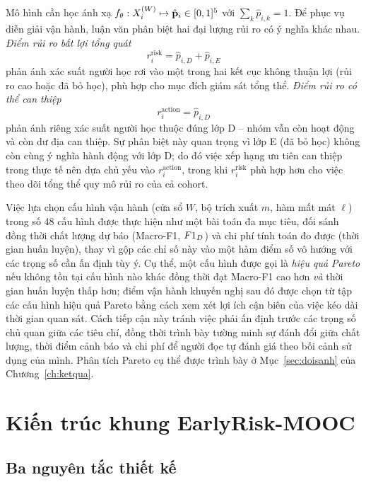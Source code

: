 Mô hình cần học ánh xạ $f_\theta : X_i^{(W)} \mapsto \hat{\mathbf{p}}_i \in [0,1]^5$ với $\sum_k \hat{p}_{i,k} = 1$. Để phục vụ diễn giải vận hành, luận văn phân biệt hai đại lượng rủi ro có ý nghĩa khác nhau. \emph{Điểm rủi ro bất lợi tổng quát}
\begin{equation}
r_i^{\text{risk}} = \hat{p}_{i,D} + \hat{p}_{i,E}
\end{equation}
phản ánh xác suất người học rơi vào một trong hai kết cục không thuận lợi (rủi ro cao hoặc đã bỏ học), phù hợp cho mục đích giám sát tổng thể. \emph{Điểm rủi ro có thể can thiệp}
\begin{equation}
r_i^{\text{action}} = \hat{p}_{i,D}
\end{equation}
phản ánh riêng xác suất người học thuộc đúng lớp D -- nhóm vẫn còn hoạt động và còn dư địa can thiệp. Sự phân biệt này quan trọng vì lớp E (đã bỏ học) không còn cùng ý nghĩa hành động với lớp D; do đó việc xếp hạng ưu tiên can thiệp trong thực tế nên dựa chủ yếu vào $r_i^{\text{action}}$, trong khi $r_i^{\text{risk}}$ phù hợp hơn cho việc theo dõi tổng thể quy mô rủi ro của cả cohort.

Việc lựa chọn cấu hình vận hành (cửa sổ $W$, bộ trích xuất $m$, hàm mất mát $\ell$) trong số 48 cấu hình được thực hiện như một bài toán đa mục tiêu, đối sánh đồng thời chất lượng dự báo (Macro-F1, $F1_{D}$) và chi phí tính toán đo được (thời gian huấn luyện), thay vì gộp các chỉ số này vào một hàm điểm số vô hướng với các trọng số cần ấn định tùy ý. Cụ thể, một cấu hình được gọi là \emph{hiệu quả Pareto} nếu không tồn tại cấu hình nào khác đồng thời đạt Macro-F1 cao hơn \emph{và} thời gian huấn luyện thấp hơn; điểm vận hành khuyến nghị sau đó được chọn từ tập các cấu hình hiệu quả Pareto bằng cách xem xét lợi ích cận biên của việc kéo dài thời gian quan sát. Cách tiếp cận này tránh việc phải ấn định trước các trọng số chủ quan giữa các tiêu chí, đồng thời trình bày tường minh sự đánh đổi giữa chất lượng, thời điểm cảnh báo và chi phí để người đọc tự đánh giá theo bối cảnh sử dụng của mình. Phân tích Pareto cụ thể được trình bày ở Mục~\ref{sec:doisanh} của Chương~\ref{ch:ketqua}.

\clearpage

\section{Kiến trúc khung EarlyRisk-MOOC}
\label{sec:kientruc}

\subsection{Ba nguyên tắc thiết kế}


